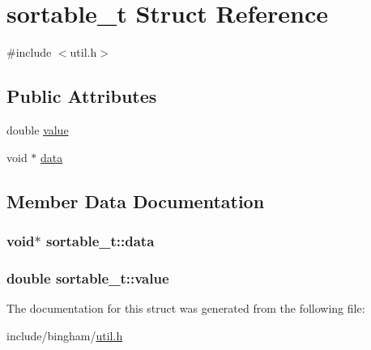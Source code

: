 \hypertarget{structsortable__t}{
\section{sortable\_\-t Struct Reference}
\label{structsortable__t}
}


{\ttfamily \#include $<$util.h$>$}

\subsection*{Public Attributes}
\begin{DoxyCompactItemize}
\item 
double \hyperlink{structsortable__t_a22623c208615a6f4e69b5a1aa6cb9946}{value}
\item 
void $\ast$ \hyperlink{structsortable__t_a9e81b0cb399f7cc027f8c9e2ec1aa8a4}{data}
\end{DoxyCompactItemize}


\subsection{Member Data Documentation}
\hypertarget{structsortable__t_a9e81b0cb399f7cc027f8c9e2ec1aa8a4}{
\subsubsection[{data}]{\setlength{\rightskip}{0pt plus 5cm}void$\ast$ {\bf sortable\_\-t::data}}}
\label{structsortable__t_a9e81b0cb399f7cc027f8c9e2ec1aa8a4}
\hypertarget{structsortable__t_a22623c208615a6f4e69b5a1aa6cb9946}{
\subsubsection[{value}]{\setlength{\rightskip}{0pt plus 5cm}double {\bf sortable\_\-t::value}}}
\label{structsortable__t_a22623c208615a6f4e69b5a1aa6cb9946}


The documentation for this struct was generated from the following file:\begin{DoxyCompactItemize}
\item 
include/bingham/\hyperlink{util_8h}{util.h}\end{DoxyCompactItemize}
